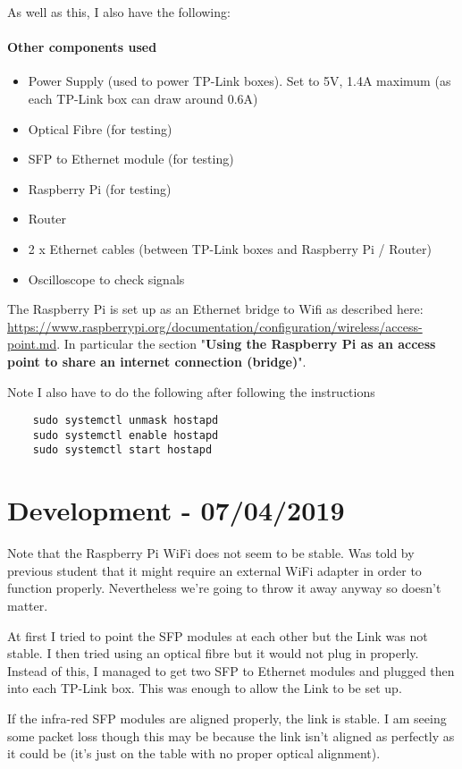 As well as this, I also have the following:

\paragraph{\textbf{Other components used}}
\begin{itemize}
\item{Power Supply (used to power TP-Link boxes). Set to 5V, 1.4A maximum
(as each TP-Link box can draw around 0.6A)}
\item{Optical Fibre (for testing)}
\item{\ac{SFP} to Ethernet module (for testing)}
\item{Raspberry Pi (for testing)}
\item{Router}
\item{2 x Ethernet cables (between TP-Link boxes and Raspberry Pi / Router)}
\item{Oscilloscope to check signals}
\end{itemize}

The Raspberry Pi is set up as an Ethernet bridge to Wifi as described here:
\url{https://www.raspberrypi.org/documentation/configuration/wireless/access-point.md}.
In particular the section "\textbf{Using the Raspberry Pi as an access
point to share an internet connection (bridge)}".

Note I also have to do the following after following the instructions
\begin{lstlisting}
	sudo systemctl unmask hostapd
	sudo systemctl enable hostapd
	sudo systemctl start hostapd
\end{lstlisting}

\section{Development - 07/04/2019}
Note that the Raspberry Pi WiFi does not seem to be stable. Was told by previous
student that it might require an external WiFi adapter in order to function
properly. Nevertheless we're going to throw it away anyway so doesn't matter.

At first I tried to point the \ac{SFP} modules at each other but the Link was
not stable. I then tried using an optical fibre but it would not plug in
properly. Instead of this, I managed to get two \ac{SFP} to Ethernet modules
and plugged then into each TP-Link box. This was enough to allow the Link
to be set up.

If the infra-red \ac{SFP} modules are aligned properly, the link is stable.
I am seeing some packet loss though this may be because the link isn't aligned
as perfectly as it could be (it's just on the table with no proper optical
alignment).

